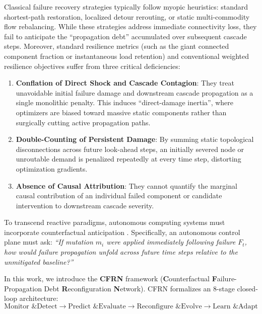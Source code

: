 \documentclass[pdflatex,sn-mathphys-num]{sn-jnl}
\theoremstyle{thmstyleone}
\theoremstyle{thmstyletwo}
\theoremstyle{thmstylethree}
\begin{document}
Classical failure recovery strategies typically follow myopic heuristics: standard shortest-path restoration, localized detour rerouting, or static multi-commodity flow rebalancing. While these strategies address immediate connectivity loss, they fail to anticipate the ``propagation debt'' accumulated over subsequent cascade steps. Moreover, standard resilience metrics (such as the giant connected component fraction or instantaneous load retention) and conventional weighted resilience objectives suffer from three critical deficiencies:
\begin{enumerate}
    \item \textbf{Conflation of Direct Shock and Cascade Contagion}: They treat unavoidable initial failure damage and downstream cascade propagation as a single monolithic penalty. This induces ``direct-damage inertia'', where optimizers are biased toward massive static components rather than surgically cutting active propagation paths.
    \item \textbf{Double-Counting of Persistent Damage}: By summing static topological disconnections across future look-ahead steps, an initially severed node or unroutable demand is penalized repeatedly at every time step, distorting optimization gradients.
    \item \textbf{Absence of Causal Attribution}: They cannot quantify the marginal causal contribution of an individual failed component or candidate intervention to downstream cascade severity.
\end{enumerate}

To transcend reactive paradigms, autonomous computing systems must incorporate counterfactual anticipation \cite{pearl2009causality,spirtes2000causation,kephart2003vision}. Specifically, an autonomous control plane must ask: \textit{``If mutation $m_i$ were applied immediately following failure $F_t$, how would failure propagation unfold across future time steps relative to the unmitigated baseline?''}

In this work, we introduce the \textbf{CFRN} framework (\textbf{C}ounterfactual \textbf{F}ailure-Propagation Debt \textbf{R}econfiguration \textbf{N}etwork). CFRN formalizes an 8-stage closed-loop architecture:
\begin{equation}
\text{Monitor \& Detect} \longrightarrow \text{Predict \& Evaluate} \longrightarrow \text{Reconfigure \& Evolve} \longrightarrow \text{Learn \& Adapt}
\end{equation}
\end{document}
